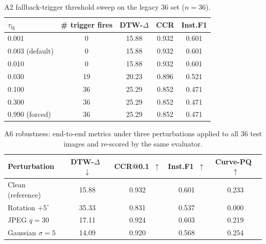 \documentclass{article}
\begin{document}
\begin{table}[h]
\centering
\caption{A2 fallback-trigger threshold sweep on the legacy $36$ set
($n{=}36$).}
\label{tab:thresh-sweep}
\small
\begin{tabular}{lcccc}
\toprule
$\tau_{\mathrm{fg}}$ & \# trigger fires & DTW-$\Delta$ & CCR & Inst.F1 \\
\midrule
0.001           & 0    & 15.88 & 0.932 & 0.601 \\
0.003 (default) & 0    & 15.88 & 0.932 & 0.601 \\
0.010           & 0    & 15.88 & 0.932 & 0.601 \\
0.030           & 19   & 20.23 & 0.896 & 0.521 \\
0.100           & 36   & 25.29 & 0.852 & 0.471 \\
0.300           & 36   & 25.29 & 0.852 & 0.471 \\
0.990 (forced)  & 36   & 25.29 & 0.852 & 0.471 \\
\bottomrule
\end{tabular}
\end{table}

\begin{table}[h]
\centering
\caption{A6 robustness: end-to-end metrics under three perturbations
applied to all 36 test images and re-scored by the same evaluator.}
\label{tab:robust-sweep}
\small
\begin{tabular}{lcccc}
\toprule
Perturbation & DTW-$\Delta$~$\downarrow$ & CCR@0.1~$\uparrow$ & Inst.F1~$\uparrow$ & Curve-PQ~$\uparrow$ \\
\midrule
Clean (reference)           & 15.88  & 0.932 & 0.601 & 0.233 \\
Rotation $+5^\circ$         & 35.33  & 0.831 & 0.537 & 0.000 \\
JPEG $q{=}30$               & 17.11  & 0.924 & 0.603 & 0.219 \\
Gaussian $\sigma{=}5$       & 14.09  & 0.920 & 0.568 & 0.254 \\
\bottomrule
\end{tabular}
\end{table}
\end{document}

